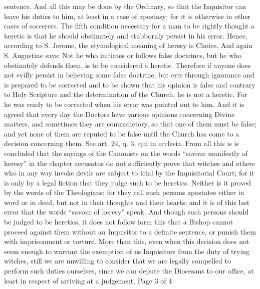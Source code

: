        sentence. And all this may be done by the Ordinary, so that the Inquisitor can leave his
       duties to him, at least in a case of apostasy; for it is otherwise in other cases of sorcerers.
             The fifth condition necessary for a man to be rightly thought a heretic is that he should
       obstinately and stubbornly persist in his error. Hence, according to S. Jerome, the
       etymological meaning of heresy is Choice. And again S. Augustine says: Not he who
       initiates or follows false doctrines, but he who obstinately defends them, is to be considered
       a heretic. Therefore if anyone does not evilly persist in believing some false doctrine, but
       errs through ignorance and is prepared to be corrected and to be shown that his opinion is
       false and contrary to Holy Scripture and the determination of the Church, he is not a heretic.
       For he was ready to be corrected when his error was pointed out to him. And it is agreed that
       every day the Doctors have various opinions concerning Divine matters, and sometimes they
       are contradictory, so that one of them must be false; and yet none of them are reputed to be
       false until the Church has come to a decision concerning them. See art. 24, q. 3, qui in
       ecclesia.
             From all this is is concluded that the sayings of the Canonists on the words “savour
       manifestly of heresy” in the chapter accusatus do not sufficiently prove that witches and
       others who in any way invoke devils are subject to trial by the Inquisitorial Court; for it is
       only by a legal fiction that they judge such to be heretics. Neither is it proved by the words
       of the Theologians; for they call such persons apostates either in word or in deed, but not in
       their thoughts and their hearts; and it is of this last error that the words “savour of heresy”
       speak.
             And though such persons should be judged to be heretics, it does not follow form this
       that a Bishop cannot proceed against them without an Inquisitor to a definite sentence, or
       punish them with imprisonment or torture. More than this, even when this decision does not
       seem enough to warrant the exemption of us Inquisitors from the duty of trying witches, still
       we are unwilling to consider that we are legally compelled to perform such duties ourselves,
       since we can depute the Diocesans to our office, at least in respect of arriving at a
       judgement.
                                                                 Page 3 of 4


